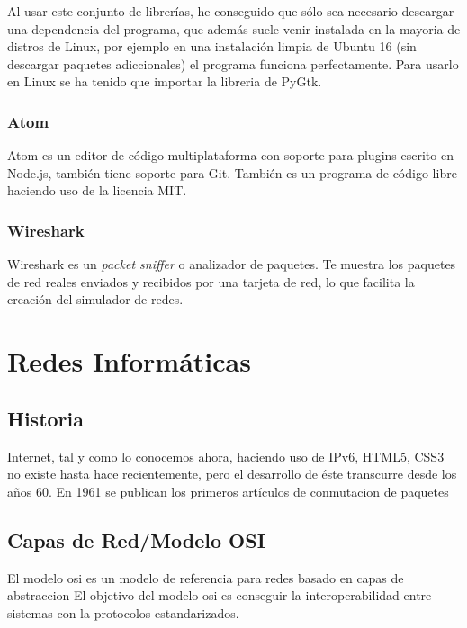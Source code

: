 \documentclass[a4paper, 11pt, twoside]{report} %
\begin{document}
Al usar este conjunto de librerías, he conseguido que sólo sea necesario descargar una dependencia del programa, que además suele venir instalada en la mayoria de distros de Linux, por ejemplo en una instalación limpia de Ubuntu 16 (sin descargar paquetes adiccionales) el programa funciona perfectamente. Para usarlo en Linux se ha tenido que importar la libreria de PyGtk.
\subsection{Atom}
Atom es un editor de código multiplataforma con soporte para plugins escrito en Node.js, también tiene soporte para Git. También es un programa de código libre haciendo uso de la licencia MIT.

\subsection{Wireshark}
Wireshark es un \textit{packet sniffer} o analizador de paquetes. Te muestra los paquetes de red reales enviados y recibidos por una tarjeta de red, lo que facilita la creación del simulador de redes.

\chapter{Redes Informáticas}

\section*{Historia}
Internet, tal y como lo conocemos ahora, haciendo uso de IPv6, HTML5, CSS3 no existe hasta hace recientemente, pero el desarrollo de éste transcurre desde los años 60. En 1961 se publican los primeros artículos de \gls{conmutacion de paquetes}

\section{Capas de Red/Modelo OSI}
El modelo \acrshort{osi} es un modelo de referencia para redes basado en \gls{capas de abstraccion}
El objetivo del modelo \acrshort{osi} es conseguir la interoperabilidad entre sistemas con la protocolos estandarizados.

\end{document}
